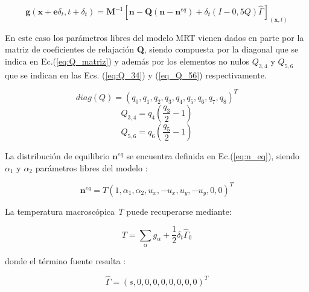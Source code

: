\begin{equation}
    \mathbf{g}(\mathbf{x} + \mathbf{e} \delta_{t} ,t + \delta_{t}) = \mathbf{M}^{-1} \left[ \mathbf{n} - \mathbf{Q}(\mathbf{n} - \mathbf{n}^{eq}) + \delta_{t} \left( I - 0,5 Q \right) \hat{\Gamma}  \right]_{(\mathbf{x},t)}
    \label{eq:fieldenergy}
\end{equation}

En este caso los parámetros libres del modelo MRT vienen dados en parte por la matriz de coeficientes de relajación \textbf{Q}, siendo compuesta por la diagonal que se indica en Ec.(\ref{eq:Q_matriz}) y además por los elementos no nulos $Q_{3,4}$ y $ Q_{5,6}$ que se indican en las Ecs. (\ref{eq:Q_34}) y (\ref{eq_Q_56})  respectivamente.

\begin{equation}
    \textit{diag} (Q) = {( q_{0} , q_{1} , q_{2} , q_{3} , q_{4} , q_{5} , q_{6} , q_{7} , q_{8} )}^{T}
    \label{eq:Q_matriz}
\end{equation}
\begin{equation}
    Q_{3,4} = q_{4} \left( \frac{q_{3}}{2} - 1 \right)
    \label{eq:Q_34}
\end{equation}
\begin{equation}
    Q_{5,6} = q_{6} \left( \frac{q_{5}}{2} - 1 \right)
    \label{eq_Q_56}
\end{equation}

La distribución de equilibrio $\mathbf{n}^{eq}$ se encuentra definida en Ec.(\ref{eq:n_eq}), siendo $\alpha_{1}$ y $\alpha_{2}$ parámetros libres del modelo :

\begin{equation}
    {\mathbf{n}}^{eq} = T { \left( 1, \alpha_{1}, \alpha_{2}, u_{x}, -u_{x}, u_{y}, -u_{y}, 0, 0 \right) }^{T}
    \label{eq:n_eq}
\end{equation}

La temperatura macroscópica \textit{T} puede recuperarse mediante:

\begin{equation}
T = \sum_{\alpha} g_{\alpha} + \frac{1}{2} \delta_{t} {\hat{\Gamma}}_{0}
\label{eq:temperatura}
\end{equation}



donde el término fuente resulta :


\begin{equation}
    \hat{\Gamma} = {( s, 0, 0, 0, 0, 0, 0, 0, 0 )}^{T}
\end{equation}

